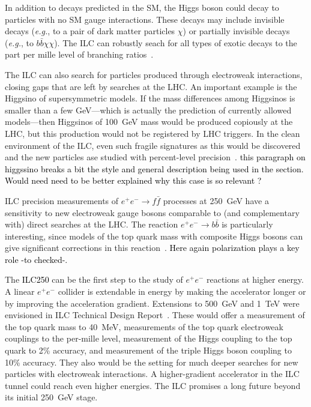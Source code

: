 \documentclass[%
 reprint,
 amsmath,amssymb,
 aps,
]{revtex4-1}
\newcommand{\juan}[1]{\textcolor{black}{{#1}}}
\newcommand{\todo}[1]{\textcolor{black}{{#1}}}
\def\eg{{\it e.g.}}
\def\ee{e^+e^-}
\begin{document}
In addition to decays predicted in the SM, the Higgs boson could decay
to particles with no SM gauge interactions.    These decays may
include invisible decays (\eg, to a pair of dark matter particles $\chi$)  or
partially invisible decays (\eg, to $b\bar b \chi \chi$).   The ILC
can robustly seach for all types of exotic decays  to the part per
mille level of branching ratios~\cite{Liu:2016zki}.

The ILC can also search for particles produced through electroweak
interactions, closing gaps that are left by searches at the LHC.  An
important example is the Higgsino of supersymmetric models.   If the
mass  differences among Higgsinos is smaller than a few GeV---which is
actually the prediction of currently allowed models---then Higgsinos
of 100~GeV mass would be produced copiously at the LHC, but this
production would not be registered by LHC triggers.  In the clean
environment of the ILC, even such fragile signatures as this 
would be discovered and the new particles ase 
studied with percent-level precision~\cite{Higgsino}. \todo{this paragraph on higgssino breaks a bit the style and general description being used in the section. Would need need to be better explained why this case is so relevant ?} 
 
ILC precision measurements of $\ee\to f\bar f$ processes at 250~GeV have a sensitivity to new
electroweak gauge bosons comparable to (and complementary with) 
direct searches at the LHC.  The reaction $\ee\to b\bar b$ is
particularly interesting, since models of the top quark mass with
composite Higgs bosons can give significant corrections in this
reaction~\cite{eetobb}. \juan{Here again polarization plays a key role -to checked-.}

The \juan{ILC250}  can be the first step to the study of $\ee$
reactions at higher energy.   A linear $\ee$ collider is extendable in
energy by making the accelerator longer or by improving the
acceleration gradient. Extensions to 500~GeV and 1~TeV were envisioned
in ILC Technical Design Report~\cite{Behnke:2013xla}.    These would offer a
measurement of the top quark mass to 40~MeV, measurements of the top
quark electroweak couplings to the per-mille level, measurement of the
Higgs coupling to the top quark to 2\% accuracy, and measurement of
the triple Higgs boson coupling to 10\%  accuracy. They  also would be
the setting for much deeper searches for new particles with electroweak interactions.
A higher-gradient accelerator in the ILC tunnel could reach even
higher energies.  The ILC promises a long future beyond its initial 250~GeV stage.
\end{document}
